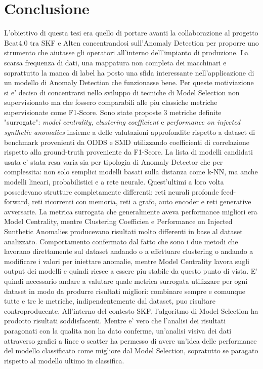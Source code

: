 \chapter{Conclusione}
\label{chap:conclusion}
L'obiettivo di questa tesi era quello di portare avanti la collaborazione al progetto Beat4.0 tra SKF e Alten concentrandosi sull'Anomaly Detection per proporre uno strumento che aiutasse gli operatori all'interno dell'impianto di produzione. La scarsa frequenza di dati, una mappatura non completa dei macchinari e soprattutto la manca di label ha posto una sfida interessante nell'applicazione di un modello di Anomaly Detection che funzionasse bene.
Per queste motiviazione si e' deciso di concentrarsi nello sviluppo di tecniche di Model Selection non supervisionato ma che fossero comparabili alle piu classiche metriche supervisionate come F1-Score.
Sono state proposte 3 metriche definite "surrogate": \textit{model centrality}, \textit{clustering coefficient} e \textit{performance on injected synthetic anomalies} insieme a delle valutazioni approfondite rispetto a dataset di benchmark provenienti da ODDS e SMD utilizzando coefficienti di correlazione rispetto alla ground-truth proveniente da F1-Score.
La lista di modelli candidati usata e' stata resa varia sia per tipologia di Anomaly Detector che per complessita: non solo semplici modelli basati sulla distanza come k-NN, ma anche modelli lineari, probabilistici e a rete neurale. Quest'ultimi a loro volta possedevano strutture completamente differenti: reti neurali profonde feed-forward, reti ricorrenti con memoria, reti a grafo, auto encoder e reti generative avversarie.
La metrica surrogata che generalmente aveva performance migliori era Model Centrality, mentre Clustering Coefficien e Performance on Injected Sunthetic Anomalies producevano risultati molto differenti in base al dataset analizzato. Comportamento confermato dal fatto che sono i due metodi che lavorano direttamente sul dataset andando o a effettuare clustering o andando a modificare i valori per iniettare anomalie, mentre Model Centrality lavora sugli output dei modelli e quindi riesce a essere piu stabile da questo punto di vista.
E' quindi necessario andare a valutare quale metrica surrogata utilizzare per ogni dataset in modo da produrre risultati migliori: combinare sempre e comunque tutte e tre le metriche, indipendentemente dal dataset, puo risultare controproducente.
All'interno del contesto SKF, l'algoritmo di Model Selection ha prodotto risultati soddisfacenti. Mentre e' vero che l'analisi dei risultati paragonati con la qualita non ha dato conferme, un'analisi visiva dei dati attraverso grafici a linee o scatter ha permesso di avere un'idea delle performance del modello classificato come migliore dal Model Selection, sopratutto se paragato rispetto al modello ultimo in classifica.
